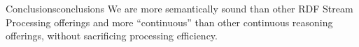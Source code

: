 \begin{nestedsection}{Conclusions}{conclusions}
	We are more semantically sound than other RDF Stream Processing offerings and more ``continuous'' than other continuous reasoning offerings, without sacrificing processing efficiency.

\end{nestedsection}